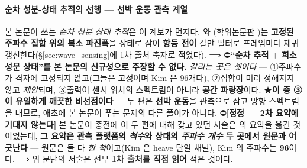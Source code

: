\documentclass[11pt]{report}
\numberwithin{equation}{chapter}
\numberwithin{figure}{chapter}
\numberwithin{table}{chapter}
\begin{document}
\paragraph{순차 성분-상태 추적의 선행 --- 선박 운동 관측 계열}
본 논문이 쓰는 \emph{순차 성분-상태 추적}은 이 계보가 먼저다.
\citet{Pascoal2017DirSpectra} 와 \citet{Kim2019InverseKF}(학위논문판
\citet{Kim2020Thesis})는 \textbf{고정된 주파수 집합 위의 복소 파진폭}을 상태로 삼아
\textbf{항등 전이} 칼만 필터로 프레임마다 재귀 갱신한다(\S\ref{sec:wave_sensing}에
1차 출처 축자로 적었다). ⟹ ⛔\textbf{``순차 추적 $+$ 희소 성분 상태''를 본 논문의
신규성으로 주장할 수 없다.}
\emph{갈리는 곳은 셋이다} --- ①주파수가 격자에 고정되지 않고(그들은 고정이며 Kim 은
$96$개다), ②집합이 미리 정해지지 않고 \emph{제안}되며, ③출력이 센서 위치의 스펙트럼이
아니라 \textbf{공간 파랑장}이다.
★\textbf{이 중 ③ 이 유일하게 깨끗한 비선점이다} --- 두 편은 \textbf{선박 운동}을
관측으로 삼고 방향 스펙트럼을 내므로, 애초에 본 논문이 푸는 문제의 다른 풀이가 아니다.
⛔\textbf{[정정 --- 2차 요약에 기대지 않는다]} 본 논문이 종전에 이 두 편에 대해 갖고
있던 서술은 \citet{Wang2025PointsToWaves} 의 요약을 옮긴 것이었는데, \textbf{그 요약은
관측 플랫폼의 \emph{척수}와 상태의 \emph{주파수 개수} 두 곳에서 원문과 어긋난다}
--- 원문은 둘 다 \emph{한 척}이고(Kim 은 heave 단일 채널), Kim 의 주파수는 \textbf{96}이다.
⟹ 위 문단의 서술은 전부 \textbf{1차 출처를 직접 읽어} 적은 것이다.
\end{document}
